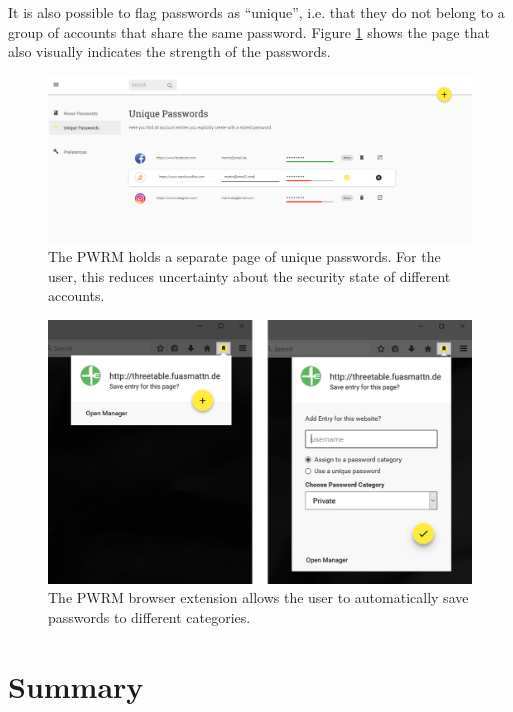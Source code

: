 It is also possible to flag passwords as ``unique'', i.e. that they do not belong to a group of accounts that share the same password. Figure \ref{fig:pwrm:entry-unique} shows the page that also visually indicates the strength of the passwords. 

\begin{figure}[hp]
	\centering
	\includegraphics[width=\linewidth]{figures/pwrm/entry-unique}
	\caption{The PWRM holds a separate page of unique passwords. For the user, this reduces uncertainty about the security state of different accounts.}
	\label{fig:pwrm:entry-unique}
\end{figure}


\begin{figure}[hp]
	\centering
	\includegraphics[width=0.9\linewidth]{figures/pwrm/extension-popus}
	\caption{The PWRM browser extension allows the user to automatically save passwords to different categories.}
	\label{fig:pwrm:extension-popus}
\end{figure}

\section{Summary}

